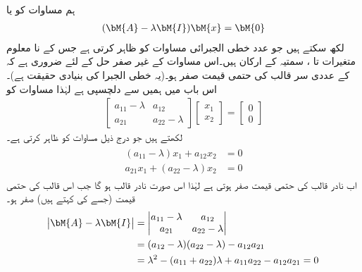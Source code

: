 ہم مساوات  کو  یا 
\begin{align}\label{مساوات_نظام_آئگنی_ب}
(\bM{A}-\lambda \bM{I})\bM{x}=\bM{0}
\end{align}
لکھ سکتے ہیں جو  عدد خطی الجبرائی مساوات کو ظاہر کرتی ہے جس کے نا معلوم متغیرات  تا ، سمتیہ  کے ارکان ہیں۔اس مساوات کے غیر صفر حل  کے لئے ضروری ہے کہ  کے عددی سر قالب کی حتمی قیمت صفر ہو۔(یہ خطی الجبرا کی بنیادی حقیقت ہے)۔ اس باب میں ہمیں   سے دلچسپی ہے لہٰذا مساوات  کو
\begin{align}\label{مساوات_نظام_آئگنی_پ}
\begin{bmatrix}
a_{11}-\lambda& a_{12}\\
a_{21}& a_{22}-\lambda
\end{bmatrix}
\begin{bmatrix}
x_1\\
x_2
\end{bmatrix}=
\begin{bmatrix}
0\\
0
\end{bmatrix}
\end{align}
لکھتے ہیں جو درج ذیل مساوات کو ظاہر کرتی ہے۔
\begin{gather}\label{مساوات_نظام_آئگنی_ت}
\begin{aligned}
(a_{11}-\lambda)x_1+a_{12}x_2&=0\\
a_{21}x_1+(a_{22}-\lambda)x_2&=0
\end{aligned}
\end{gather}
اب نادر قالب کی حتمی قیمت صفر ہوتی ہے لہٰذا   اس صورت نادر قالب ہو گا جب اس قالب کی حتمی قیمت (جسے  کی  کہتے ہیں) صفر ہو۔
\begin{gather}\label{مساوات_نظام_آئگنی_ٹ}
\begin{aligned}
\abs{\bM{A}-\lambda \bM{I}}&=
\begin{vmatrix}
a_{11}-\lambda& a_{12}\\
a_{21}& a_{22}-\lambda
\end{vmatrix}\\
&=(a_{12}-\lambda)(a_{22}-\lambda)-a_{12}a_{21}\\
&=\lambda^2-(a_{11}+a_{22})\lambda+a_{11}a_{22}-a_{12}a_{21}=0
\end{aligned}
\end{gather}
